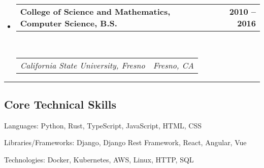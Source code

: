 \documentclass[10pt,letterpaper]{article}
\makeatletter
\newenvironment{indentsection}[1]%
{\begin{list}{}%
    {\setlength{\leftmargin}{#1}}%
    \item[]%
}
{\end{list}}
\newcommand{\headerrow}[2]
{\begin{tabular*}{\linewidth}{l@{\extracolsep{\fill}}r}
#1 &
#2 \\
\end{tabular*}}
\makeatother
\begin{document}
\begin{itemize}
    \parskip=0.1em

    \item
          \headerrow
          {\textbf{College of Science and Mathematics, Computer Science, B.S.}}
          {\textbf{2010 -- 2016}}
          \\
          \headerrow
          {\emph{California State University, Fresno}}
          {\emph{Fresno, CA}}

\end{itemize}


\hrule
\vspace{-0.4em}
\subsection*{Core Technical Skills}

\begin{indentsection}{\parindent}
    \begin{description*}
        \item[Languages:]
            Python, Rust, TypeScript, JavaScript, HTML, CSS
        \item[Libraries/Frameworks:]
            Django, Django Rest Framework, React, Angular, Vue
        \item[Technologies:]
            Docker, Kubernetes, AWS, Linux, HTTP, SQL
    \end{description*}
\end{indentsection}
\end{document}
